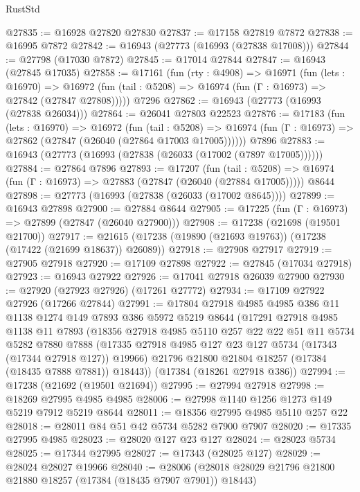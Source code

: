 \begin{lexlean}{RustStd}
\begin{coremodule}
@27835 := @16928 @27820 @27830
@27837 := @17158 @27819 @7872
@27838 := @16995 @7872
@27842 := @16943 (@27773 (@16993 (@27838 @17008)))
@27844 := @27798 (@17030 @7872)
@27845 := @17014 @27844
@27847 := @16943 (@27845 @17035)
@27858 := @17161
    (fun (rty : @4908) =>
    @16971
      (fun (lets : @16970) =>
      @16972 (fun (tail : @5208) => @16974 (fun (Γ : @16973) => @27842 (@27847 @27808)))))
    @7296
@27862 := @16943 (@27773 (@16993 (@27838 @26034)))
@27864 := @26041 @27803 @22523
@27876 := @17183
    (fun (lets : @16970) =>
    @16972
      (fun (tail : @5208) =>
      @16974 (fun (Γ : @16973) => @27862 (@27847 (@26040 (@27864 @17003 @17005))))))
    @7896
@27883 := @16943 (@27773 (@16993 (@27838 (@26033 (@17002 (@7897 @17005))))))
@27884 := @27864 @7896
@27893 := @17207
    (fun (tail : @5208) => @16974 (fun (Γ : @16973) => @27883 (@27847 (@26040 (@27884 @17005)))))
    @8644
@27898 := @27773 (@16993 (@27838 (@26033 (@17002 @8645))))
@27899 := @16943 @27898
@27900 := @27884 @8644
@27905 := @17225 (fun (Γ : @16973) => @27899 (@27847 (@26040 @27900)))
@27908 := @17238 (@21698 (@19501 @21700))
@27917 := @21615 (@17238 (@19890 (@21693 @19763)) (@17238 (@17422 (@21699 @18637)) @26089))
@27918 := @27908 @27917
@27919 := @27905 @27918
@27920 := @17109 @27898
@27922 := @27845 (@17034 @27918)
@27923 := @16943 @27922
@27926 := @17041 @27918 @26039 @27900
@27930 := @27920 (@27923 @27926) (@17261 @27772)
@27934 := @17109 @27922 @27926 (@17266 @27844)
@27991 := @17804
    @27918
    @4985
    @4985
    @386
    @11
    @1138
    @1274
    @149
    @7893
    @386
    @5972
    @5219
    @8644
    (@17291
      @27918
      @4985
      @1138
      @11
      @7893
      (@18356
        @27918
        @4985
        @5110
        @257
        @22
        @22
        @51
        @11
        @5734
        @5282
        @7880
        @7888
        (@17335 @27918 @4985 @127 @23 @127 @5734 (@17343 (@17344 @27918 @127)) @19966)
        @21796
        @21800
        @21804
        @18257
        (@17384 (@18435 @7888 @7881))
        @18443))
    (@17384 (@18261 @27918 @386))
@27994 := @17238 (@21692 (@19501 @21694))
@27995 := @27994 @27918
@27998 := @18269 @27995 @4985 @4985
@28006 := @27998 @1140 @1256 @1273 @149 @5219 @7912 @5219 @8644
@28011 := @18356 @27995 @4985 @5110 @257 @22
@28018 := @28011 @84 @51 @42 @5734 @5282 @7900 @7907
@28020 := @17335 @27995 @4985
@28023 := @28020 @127 @23 @127
@28024 := @28023 @5734
@28025 := @17344 @27995
@28027 := @17343 (@28025 @127)
@28029 := @28024 @28027 @19966
@28040 := @28006 (@28018 @28029 @21796 @21800 @21880 @18257 (@17384 (@18435 @7907 @7901)) @18443)

\end{coremodule}
\end{lexlean}

